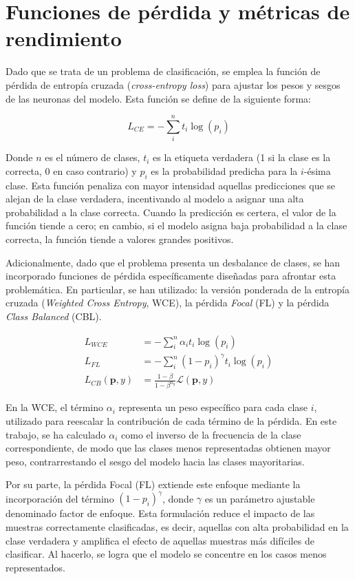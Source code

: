 \section{Funciones de pérdida y métricas de rendimiento}
\label{section5:metrics}
Dado que se trata de un problema de clasificación, se emplea la función de pérdida de entropía cruzada (\textit{cross-entropy loss}) para ajustar los pesos y sesgos de las neuronas del modelo. Esta función se define de la siguiente forma:

\begin{equation}
L_{CE} = -\sum_i^n t_i \log(p_i)
\end{equation}

Donde $n$ es el número de clases, $t_i$ es la etiqueta verdadera (1 si la clase es la correcta, 0 en caso contrario) y $p_i$ es la probabilidad predicha para la $i$-ésima clase. Esta función penaliza con mayor intensidad aquellas predicciones que se alejan de la clase verdadera, incentivando al modelo a asignar una alta probabilidad a la clase correcta. Cuando la predicción es certera, el valor de la función tiende a cero; en cambio, si el modelo asigna baja probabilidad a la clase correcta, la función tiende a valores grandes positivos.

Adicionalmente, dado que el problema presenta un desbalance de clases, se han incorporado funciones de pérdida específicamente diseñadas para afrontar esta problemática. En particular, se han utilizado: la versión ponderada de la entropía cruzada (\textit{Weighted Cross Entropy}, WCE), la pérdida \textit{Focal} (FL) y la pérdida \textit{Class Balanced} (CBL).

\begin{align}
    L_{WCE} &= -\sum_i^n \alpha_{i} t_i \log(p_i) \\
    L_{FL} &= -\sum_i^n (1-p_i)^{\gamma} t_i \log(p_i) \\
    L_{CB}(\textbf{p},y) &= \frac{1-\beta}{1-\beta^{n_{y}}} \mathcal{L}(\textbf{p},y)
\end{align}

En la WCE, el término $\alpha_i$ representa un peso específico para cada clase $i$, utilizado para reescalar la contribución de cada término de la pérdida. En este trabajo, se ha calculado $\alpha_i$ como el inverso de la frecuencia de la clase correspondiente, de modo que las clases menos representadas obtienen mayor peso, contrarrestando el sesgo del modelo hacia las clases mayoritarias.

Por su parte, la pérdida Focal (FL) \cite{lin_focal_2020} extiende este enfoque mediante la incorporación del término $(1 - p_i)^\gamma$, donde $\gamma$ es un parámetro ajustable denominado factor de enfoque. Esta formulación reduce el impacto de las muestras correctamente clasificadas, es decir, aquellas con alta probabilidad en la clase verdadera y amplifica el efecto de aquellas muestras más difíciles de clasificar. Al hacerlo, se logra que el modelo se concentre en los casos menos representados.

